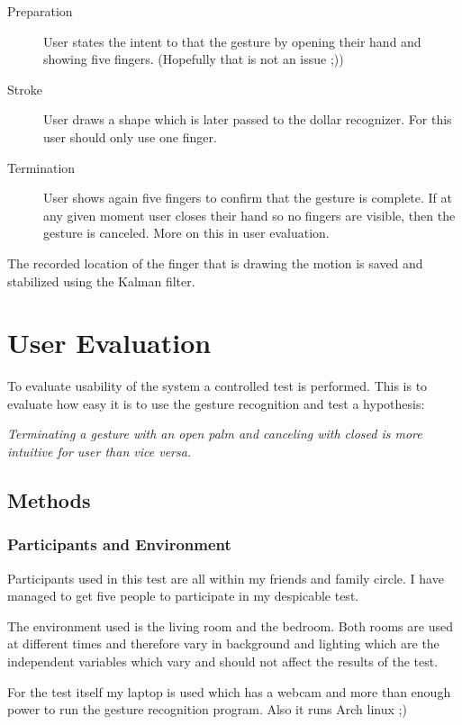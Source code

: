 \documentclass[11pt,a4paper]{article}
\begin{document}
\begin{description}
\item[Preparation] User states the intent to that the gesture by opening their hand and showing five fingers. (Hopefully that is not an issue ;))
\item[Stroke] User draws a shape which is later passed to the dollar recognizer. For this user should only use one finger.
\item[Termination] User shows again five fingers to confirm that the gesture is complete. If at any given moment user closes their hand so no fingers are visible, then the gesture is canceled. More on this in user evaluation.
\end{description}

The recorded location of the finger that is drawing the motion is saved and stabilized using the Kalman filter.

\section{User Evaluation}
To evaluate usability of the system a controlled test is performed. This is to evaluate how easy it is to use the gesture recognition and test a hypothesis:

\begin{center}
\textit{Terminating a gesture with an open palm and canceling with closed is more intuitive for user than vice versa.}
\end{center}

\subsection{Methods}
\subsubsection{Participants and Environment}
Participants used in this test are all within my friends and family circle. I have managed to get five people to participate in my despicable test.\bigskip

The environment used is the living room and the bedroom. Both rooms are used at different times and therefore vary in background and lighting which are the independent variables which vary and should not affect the results of the test.\bigskip

For the test itself my laptop is used which has a webcam and more than enough power to run the gesture recognition program. Also it runs Arch linux ;)
\end{document}
